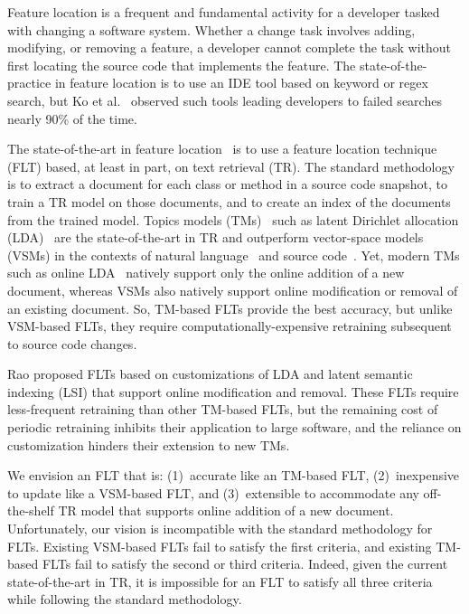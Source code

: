 
Feature location is a frequent and fundamental activity for a developer tasked with changing a software system.
Whether a change task involves adding, modifying, or removing a feature, a developer cannot complete the task without first locating the source code that implements the feature.
The state-of-the-practice in feature location is to use an IDE tool based on keyword or regex search, but Ko et al.~\cite{Ko-etal:2006} observed such tools leading developers to failed searches nearly 90\% of the time.

The state-of-the-art in feature location~\cite{Dit-etal:2011} is to use a feature location technique (FLT) based, at least in part, on text retrieval (TR).
The standard methodology~\cite{Marcus-etal:2004} is to extract a document for each class or method in a source code snapshot, to train a TR model on those documents, and to create an index of the documents from the trained model.
Topics models (TMs)~\cite{Blei:2012} such as latent Dirichlet allocation (LDA)~\cite{Blei-etal:2003} are the state-of-the-art in TR and outperform vector-space models (VSMs) in the contexts of natural language~\cite{Deerwester-etal:1990,Blei-etal:2003} and source code~\cite{Poshyvanyk-etal:2007,Lukins-etal:2010}.
Yet, modern TMs such as online LDA~\cite{Hoffman-etal:2010} natively support only the online addition of a new document, whereas VSMs also natively support online modification or removal of an existing document.
So, TM-based FLTs provide the best accuracy, but unlike VSM-based FLTs, they require computationally-expensive retraining subsequent to source code changes.

Rao\cite{Rao:2013} proposed FLTs based on customizations of LDA and latent semantic indexing (LSI) that support online modification and removal.
These FLTs require less-frequent retraining than other TM-based FLTs,
but the remaining cost of periodic retraining inhibits their application to large software, and the reliance on customization hinders their extension to new TMs.

We envision an FLT that is: (1)~accurate like an TM-based FLT, (2)~inexpensive to update like a VSM-based FLT, and (3)~extensible to accommodate any off-the-shelf TR model that supports online addition of a new document.
Unfortunately, our vision is incompatible with the standard methodology for FLTs.
Existing VSM-based FLTs fail to satisfy the first criteria, and existing TM-based FLTs fail to satisfy the second or third criteria.
Indeed, given the current state-of-the-art in TR, it is impossible for an FLT to satisfy all three criteria while following the standard methodology.

